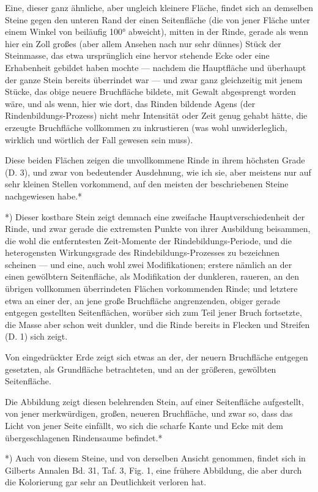 \documentclass[a4paper, 11pt, oneside, german]{article}
\begin{document}
Eine, dieser ganz ähnliche, aber ungleich kleinere Fläche, findet sich an demselben Steine gegen den unteren Rand der einen Seitenfläche (die von jener Fläche unter einem Winkel von beiläufig 100° abweicht), mitten in der Rinde, gerade als wenn hier ein Zoll großes (aber allem Ansehen nach nur sehr dünnes) Stück der Steinmasse, das etwa ursprünglich eine hervor stehende Ecke oder eine Erhabenheit gebildet haben mochte --- nachdem die Hauptfläche und überhaupt der ganze Stein bereits überrindet war --- und zwar ganz gleichzeitig mit jenem Stücke, das obige neuere Bruchfläche bildete, mit Gewalt abgesprengt worden wäre, und als wenn, hier wie dort, das Rinden bildende Agens (der Rindenbildungs-Prozess) nicht mehr Intensität oder Zeit genug gehabt hätte, die erzeugte Bruchfläche vollkommen zu inkrustieren (was wohl unwiderleglich, wirklich und wörtlich der Fall gewesen sein muss).

Diese beiden Flächen zeigen die unvollkommene Rinde in ihrem höchsten Grade (D. 3), und zwar von bedeutender Ausdehnung, wie ich sie, aber meistens nur auf sehr kleinen Stellen vorkommend, auf den meisten der beschriebenen Steine nachgewiesen habe.*

*) Dieser kostbare Stein zeigt demnach eine zweifache Hauptverschiedenheit der Rinde, und zwar gerade die extremsten Punkte von ihrer Ausbildung beisammen, die wohl die entferntesten Zeit-Momente der Rindebildungs-Periode, und die heterogensten Wirkungsgrade des Rindebildungs-Prozesses zu bezeichnen scheinen --- und eine, auch wohl zwei Modifikationen; erstere nämlich an der einen gewölbtern Seitenfläche, als Modifikation der dunkleren, raueren, an den übrigen vollkommen überrindeten Flächen vorkommenden Rinde; und letztere etwa an einer der, an jene große Bruchfläche angrenzenden, obiger gerade entgegen gestellten Seitenflächen, worüber sich zum Teil jener Bruch fortsetzte, die Masse aber schon weit dunkler, und die Rinde bereits in Flecken und Streifen (D. 1) sich zeigt.

Von eingedrückter Erde zeigt sich etwas an der, der neuern Bruchfläche entgegen gesetzten, als Grundfläche betrachteten, und an der größeren, gewölbten Seitenfläche.

Die Abbildung zeigt diesen belehrenden Stein, auf einer Seitenfläche aufgestellt, von jener merkwürdigen, großen, neueren Bruchfläche, und zwar so, dass das Licht von jener Seite einfällt, wo sich die scharfe Kante und Ecke mit dem übergeschlagenen Rindensaume befindet.*

*) Auch von diesem Steine, und von derselben Ansicht genommen, findet sich in Gilberts Annalen Bd. 31, Taf. 3, Fig. 1, eine frühere Abbildung, die aber durch die Kolorierung gar sehr an Deutlichkeit verloren hat.
\end{document}
